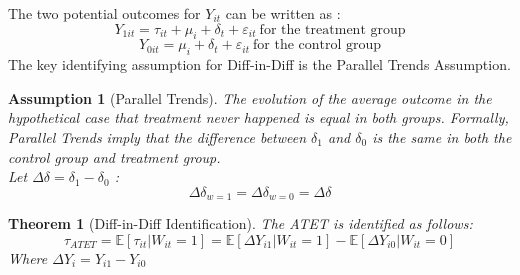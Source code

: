 \documentclass[12pt]{article}
\theoremstyle{plain}
\newtheorem{assumption}{Assumption}
\newtheorem{theorem}{Theorem}[section]
\theoremstyle{remark}
\begin{document}
The two potential outcomes for $Y_{it}$ can be written as :
\[Y_{1it}= \tau_{it}+\mu_{i}+\delta_t+\varepsilon_{it}\ \text{for the treatment group}\]
\[Y_{0it}= \mu_{i}+\delta_t+\varepsilon_{it}\ \text{for the control group}  \]
The key identifying assumption for Diff-in-Diff is the Parallel Trends Assumption. 

\begin{assumption}[Parallel Trends]
    The evolution of the average outcome in the hypothetical case that treatment never happened is equal in both groups. Formally, Parallel Trends imply that the difference between $\delta_1$ and $\delta_0$ is the same in both the control group and treatment group.
    \\Let $\Delta\delta =\delta_1 -\delta_0 $ : 
            \[ \Delta\delta_{w=1} = \Delta\delta_{w=0} = \Delta\delta \]
\end{assumption}
\begin{theorem}[Diff-in-Diff Identification] The ATET is identified as follows:        \begin{equation}
            \tau_{ATET} = \mathbb{E}\left[\tau_{it}|W_{it}=1 \right] 
            = \mathbb{E}\left[\Delta Y_{i1} |W_{it} =1 \right] - \mathbb{E}\left[\Delta Y_{i0} |W_{it} =0 \right] 
        \end{equation}
Where $\Delta Y_{i} = Y_{i1} - Y_{i0}$
\end{theorem}
\end{document}
